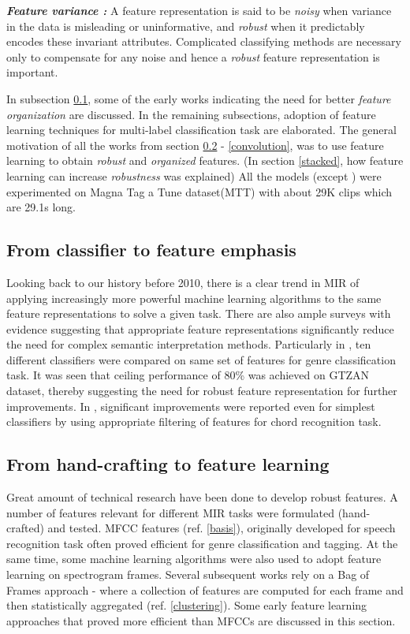 \noindent \textit{\textbf{Feature variance :}} A feature representation is said to be \textit{noisy} when variance in the data is misleading or uninformative, and \textit{robust} when it predictably encodes these invariant attributes. Complicated classifying methods are necessary only to compensate for any noise and hence a \textit{robust} feature representation is important.
\bigskip

\noindent In subsection \ref{feature}, some of the early works indicating the need for better \textit{feature organization} are discussed. In the remaining subsections, adoption of feature learning techniques for multi-label classification task are elaborated. The general motivation of all the works from section \ref{featurelearning} - \ref{convolution}, was to use feature learning to obtain \textit{robust} and \textit{organized} features. (In section \ref{stacked}, how feature learning can increase \textit{robustness} was explained) All the models (except \cite{MusicMotive}) were experimented on Magna Tag a Tune dataset(MTT)\cite{MTT} with about 29K clips which are 29.1s long.


\subsection{From classifier to feature emphasis}
\label{feature}
Looking back to our history before 2010, there is a clear trend in MIR of applying increasingly more powerful machine learning algorithms to the same feature representations to solve a given task. There are also ample surveys with evidence suggesting that appropriate feature representations significantly reduce the need for complex semantic interpretation methods\cite{survey3}. Particularly in \cite{feature1}, ten different classifiers were compared on same set of features for genre classification task. It was seen that ceiling performance of 80\% was achieved on GTZAN dataset, thereby suggesting the need for robust feature representation for further improvements. In \cite{feature2}, significant improvements were reported even for simplest classifiers by using appropriate filtering of features for chord recognition task. 

\subsection{From hand-crafting to feature learning}
\label{featurelearning}
Great amount of technical research have been done to develop robust features. A number of features relevant for different MIR tasks were formulated (hand-crafted) and tested. MFCC features (ref. \ref{basis}), originally developed for speech recognition task often proved efficient for genre classification and tagging. At the same time, some machine learning algorithms were also used to adopt feature learning on spectrogram frames. Several subsequent works rely on a Bag of Frames approach - where a collection of features are computed for each frame and then statistically aggregated (ref. \ref{clustering}). Some early feature learning approaches that proved more efficient than MFCCs are discussed in this section.
\bigskip


